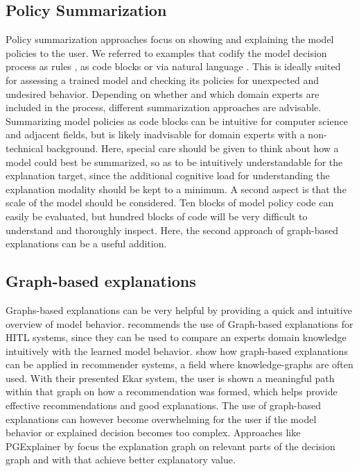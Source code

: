 \documentclass[twoside,11pt]{article}
\begin{document}
\subsection{Policy Summarization}
Policy summarization approaches focus on showing and explaining the model policies to the user. We referred to examples that codify the model decision process as rules \cite{LiuEtAl:2018:LinearModelUTrees}, as code blocks \cite{VermaEtAl:2018:ProgrammaticallyInterpretableRL} or via natural language \cite{AlonsoEtAl:2018:xAINLBeerClassifier}. 
This is ideally suited for assessing a trained model and checking its policies for unexpected and undesired behavior. Depending on whether and which domain experts are included in the process, different summarization approaches are advisable. Summarizing model policies as code blocks can be intuitive for computer science and adjacent fields, but is likely inadvisable for domain experts with a non-technical background. Here, special care should be given to think about how a model could best be summarized, so as to be intuitively understandable for the explanation target, since the additional cognitive load for understanding the explanation modality should be kept to a minimum.
A second aspect is that the scale of the model should be considered. Ten blocks of model policy code can easily be evaluated, but hundred blocks of code will be very difficult to understand and thoroughly inspect. Here, the second approach of graph-based explanations can be a useful addition.

\subsection{Graph-based explanations}

Graphs-based explanations can be very helpful by providing a quick and intuitive overview of model behavior. \cite{Holzinger:2016:iML} recommends the use of Graph-based explanations for HITL systems, since they can be used to compare an experts domain knowledge intuitively with the learned model behavior. \cite{SongEtAl:2019:ExplainableGraphBasedRecommendations} show how graph-based explanations can be applied in recommender systems, a field where knowledge-graphs are often used. With their presented Ekar system, the user is shown a meaningful path within that graph on how a recommendation was formed, which helps provide effective recommendations and good explanations.
The use of graph-based explanations can however become overwhelming for the user if the model behavior or explained decision becomes too complex. Approaches like PGExplainer by \cite{Vu:2020:PGMExplainer} focus the explanation graph on relevant parts of the decision graph and with that achieve better explanatory value.
\end{document}
